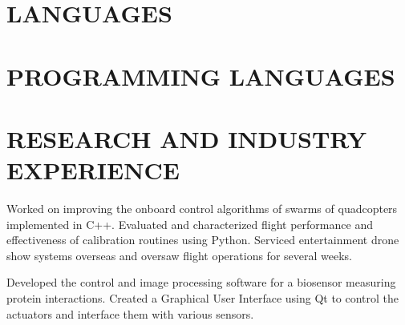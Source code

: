 \documentclass{ResumeTemplate}
\begin{document}
\begin{minipage}[c]{0.24\linewidth}
		\section{LANGUAGES}


		\section{PROGRAMMING LANGUAGES}

	\end{minipage}
	
	\section{RESEARCH AND INDUSTRY EXPERIENCE}
	

	\workitemsthree
	{Worked on improving the onboard control algorithms of swarms of quadcopters implemented in C++.}
	{Evaluated and characterized flight performance and effectiveness of calibration routines using Python.}
	{Serviced entertainment drone show systems overseas and oversaw flight operations for several weeks.}
	
	
	\workitemstwo
	{Developed the control and image processing software for a biosensor measuring protein interactions.}
	{Created a Graphical User Interface using Qt to control the actuators and interface them with various sensors.}
	
\end{document}
